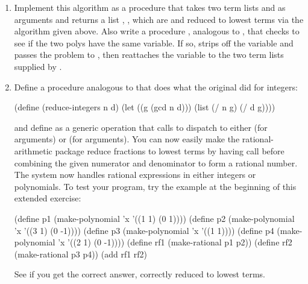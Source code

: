 \begin{exercise}
	\label{Exercise 2.97}
	\begin{enumerate}[label = \alph*., leftmargin = *]

		\item
			Implement this algorithm as a procedure  that takes two term lists  and  as arguments and returns a list , , which are  and  reduced to lowest terms via the algorithm given above.
			Also write a procedure , analogous to , that checks to see if the two polys have the same variable.
			If so,  strips off the variable and passes the problem to , then reattaches the variable to the two term lists supplied by .

		\item
			Define a procedure analogous to  that does what the original  did for integers:
			\begin{scheme}
			  (define (reduce-integers n d)
			    (let ((g (gcd n d)))
			      (list (/ n g) (/ d g))))
			\end{scheme}
			and define  as a generic operation that calls  to dispatch to either  (for  arguments) or  (for  arguments).
			You can now easily make the rational-arithmetic package reduce fractions to lowest terms by having  call  before combining the given numerator and denominator to form a rational number.
			The system now handles rational expressions in either integers or polynomials.
			To test your program, try the example at the beginning of this extended exercise:
			\begin{scheme}
			  (define  p1 (make-polynomial 'x '((1 1) (0  1))))
			  (define  p2 (make-polynomial 'x '((3 1) (0 -1))))
			  (define  p3 (make-polynomial 'x '((1 1))))
			  (define  p4 (make-polynomial 'x '((2 1) (0 -1))))
			  (define rf1 (make-rational p1 p2))
			  (define rf2 (make-rational p3 p4))
			  (add rf1 rf2)
			\end{scheme}
			See if you get the correct answer, correctly reduced to lowest terms.

	\end{enumerate}
\end{exercise}


